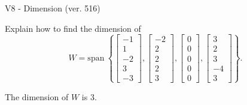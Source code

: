 \begin{exercise}
  \begin{exerciseTitle}V8 - Dimension (ver. 516)\end{exerciseTitle}
  \begin{exerciseStatement}
    Explain how to find the dimension of 
\[W=\mathrm{span}\ \left\{\left[\begin{array}{r}
-1 \\
1 \\
-2 \\
3 \\
-3
\end{array}\right] , \left[\begin{array}{r}
-2 \\
2 \\
2 \\
2 \\
3
\end{array}\right] , \left[\begin{array}{r}
0 \\
0 \\
0 \\
0 \\
0
\end{array}\right] , \left[\begin{array}{r}
3 \\
2 \\
3 \\
-4 \\
3
\end{array}\right]\right\}.\]



  \end{exerciseStatement}
  \begin{exerciseAnswer}
   The dimension of \(W\) is  \(3\).
  


  \end{exerciseAnswer}
\end{exercise}